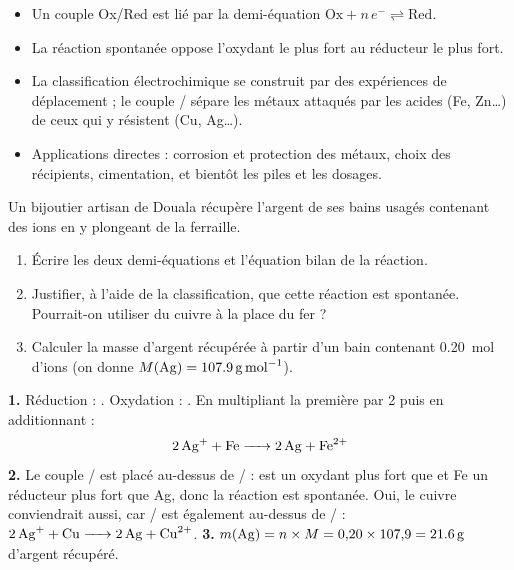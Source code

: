 \documentclass[11pt]{article}
\begin{document}
\begin{aretenir}
\begin{itemize}
\item Un couple Ox/Red est lié par la demi-équation $\mathrm{Ox} + n\,e^- \rightleftharpoons \mathrm{Red}$.
\item La réaction spontanée oppose l'oxydant le plus fort au réducteur le plus fort.
\item La classification électrochimique se construit par des expériences de déplacement ; le couple / sépare les métaux attaqués par les acides (Fe, Zn\ldots) de ceux qui y résistent (Cu, Ag\ldots).
\item Applications directes : corrosion et protection des métaux, choix des récipients, cimentation, et bientôt les piles et les dosages.
\end{itemize}
\end{aretenir}

\begin{exercice}
Un bijoutier artisan de Douala récupère l'argent de ses bains usagés contenant des ions  en y plongeant de la ferraille.
\begin{enumerate}
\item Écrire les deux demi-équations et l'équation bilan de la réaction.
\item Justifier, à l'aide de la classification, que cette réaction est spontanée. Pourrait-on utiliser du cuivre à la place du fer ?
\item Calculer la masse d'argent récupérée à partir d'un bain contenant \SI{0,20}{mol} d'ions  (on donne $M(\ce{Ag}) = \SI{107,9}{g.mol^{-1}}$).
\end{enumerate}
\end{exercice}

\begin{corrige}
\textbf{1.} Réduction : . Oxydation : . En multipliant la première par 2 puis en additionnant :
\[ \ce{2Ag+ + Fe -> 2Ag + Fe^2+} \]
\textbf{2.} Le couple / est placé au-dessus de / :  est un oxydant plus fort que  et Fe un réducteur plus fort que Ag, donc la réaction est spontanée. Oui, le cuivre conviendrait aussi, car / est également au-dessus de / : $\ce{2Ag+ + Cu -> 2Ag + Cu^2+}$.
\textbf{3.} $m(\ce{Ag}) = n \times M = 0{,}20 \times 107{,}9 = \SI{21,6}{g}$ d'argent récupéré.
\end{corrige}
\end{document}
